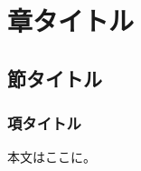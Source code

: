


\maketitle
\tableofcontents
\section{章タイトル}
\subsection{節タイトル}
\subsubsection{項タイトル}

本文はここに。




